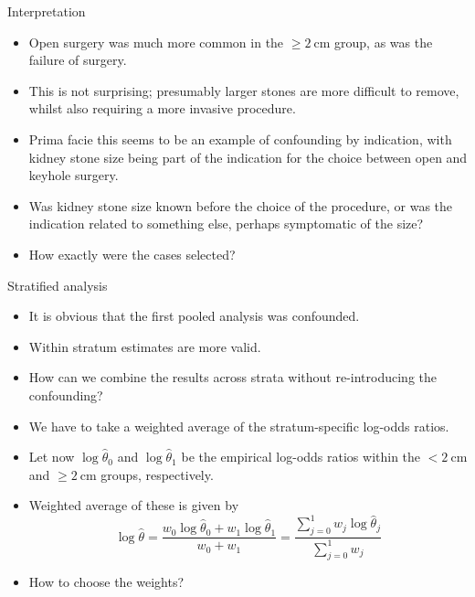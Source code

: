 \documentclass[10pt,handout]{beamer}\usepackage[]{graphicx}\usepackage[]{color}
\begin{document}
\begin{frame}{Interpretation}
\begin{itemize}
	\item Open surgery was much more common in the $\geq 2 \mathrm{~cm}$ group, as was the failure of surgery.
	\item  This is not surprising; presumably larger stones are more difficult to remove, whilst also requiring a more invasive procedure.
	\item  Prima facie this seems to be an example of confounding by indication, with kidney stone size being part of the indication for the choice between open and keyhole
	surgery.
	\item  Was kidney stone size known before the choice of the procedure, or was the indication related to something else, perhaps symptomatic of the size?
	\item  How exactly were the cases selected?
\end{itemize}
\end{frame}




\begin{frame}{Stratified analysis}
	\begin{itemize}
		\item It is obvious that the first pooled analysis was confounded.
		\item  Within stratum estimates are more valid.
		\item  How can we combine the results across strata without
		re-introducing the confounding?
		\item  We have to take a weighted average of the stratum-specific log-odds ratios.
		\item  Let now $\log \hat{\theta}_{0}$ and $\log \hat{\theta}_{1}$ be the empirical log-odds ratios within the $<2 \mathrm{~cm}$ and $\geq 2 \mathrm{~cm}$ groups, respectively.
		\item  Weighted average of these is given by
		$$
		\log \hat{\theta}=\frac{w_{0} \log \hat{\theta}_{0}+w_{1} \log \hat{\theta}_{1}}{w_{0}+w_{1}}=\frac{\sum_{j=0}^{1} w_{j} \log \hat{\theta}_{j}}{\sum_{j=0}^{1} w_{j}}
		$$
		\item  How to choose the weights?
	\end{itemize}
\end{frame}
\end{document}

